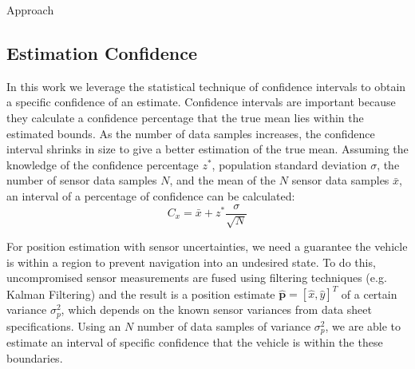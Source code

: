 \begin{section}{Approach}

	
	

\subsection{Estimation Confidence}

In this work we leverage the statistical technique of confidence intervals \cite{devore2011probability} to obtain a specific confidence of an estimate. Confidence intervals are important because they calculate a confidence percentage that the true mean lies within the estimated bounds. As the number of data samples increases, the confidence interval shrinks in size to give a better estimation of the true mean. Assuming the knowledge of the confidence percentage $z^{*}$, population standard deviation $\sigma$, the number of sensor data samples $N$, and the mean of the $N$ sensor data samples $\bar{x}$, an interval of a percentage of confidence can be calculated:
    \begin{equation}
     \label{Confidence_interval}
		C_x = \bar{x} + z^{*}\frac{\sigma}{\sqrt{N}}
	\end{equation}
	
For position estimation with sensor uncertainties, we need a guarantee the vehicle is within a region to prevent navigation into an undesired state. To do this, uncompromised sensor measurements are fused using filtering techniques (e.g. Kalman Filtering) and the result is a position estimate $\hat{\bm{p}}=[\hat{x},\hat{y}]^T$ of a certain variance $\sigma_p^2$, which depends on the known sensor variances from data sheet specifications. Using an $N$ number of data samples of variance $\sigma_p^2$, we are able to estimate an interval of specific confidence that the vehicle is within the these boundaries.


\end{section}
